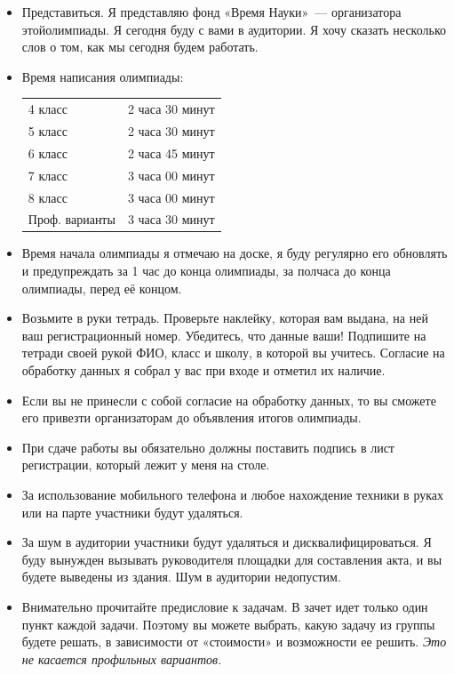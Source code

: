 \documentclass[a4paper,12pt]{article}
\begin{document}
\begin{itemize}
	\item Представиться. Я представляю фонд «Время Науки»~— организатора этой\linebreak олимпиады. Я сегодня буду с вами в аудитории. Я хочу сказать несколько слов о том, как мы сегодня будем работать.
	\item Время написания олимпиады: \begin{center} \begin{tabular}{ll}
		4 класс & 2 часа 30 минут \\
		5 класс & 2 часа 30 минут \\
		6 класс & 2 часа 45 минут \\
		7 класс & 3 часа 00 минут \\
		8 класс & 3 часа 00 минут \\
		Проф. варианты & 3 часа 30 минут \\
	\end{tabular} \end{center}
	\item Время начала олимпиады я отмечаю на доске, я буду регулярно его обновлять и предупреждать за 1 час до конца олимпиады, за полчаса до конца олимпиады, перед её концом. 
	\item Возьмите в руки тетрадь. Проверьте наклейку, которая вам выдана, на ней ваш регистрационный номер. Убедитесь, что данные ваши! Подпишите на тетради своей рукой ФИО, класс и школу, в которой вы учитесь. Согласие на обработку данных я собрал у вас при входе и отметил их наличие. 
	\item Если вы не принесли с собой согласие на обработку данных, то вы сможете его привезти организаторам до объявления итогов олимпиады.
	\item При сдаче работы вы обязательно должны поставить подпись в лист регистрации, который лежит у меня на столе.
	\item За использование мобильного телефона и любое нахождение техники в руках или на парте участники будут удаляться.
	\item За шум в аудитории участники будут удаляться и дисквалифицироваться. Я буду вынужден вызывать руководителя площадки для составления акта, и вы будете выведены из здания. Шум в аудитории недопустим. 
	\item Внимательно прочитайте предисловие к задачам. В зачет идет только один пункт каждой задачи. Поэтому вы можете выбрать, какую задачу из группы будете решать, в зависимости от  «стоимости» и возможности ее решить. {\itshape Это не касается профильных вариантов.}

\end{itemize}
\end{document}
